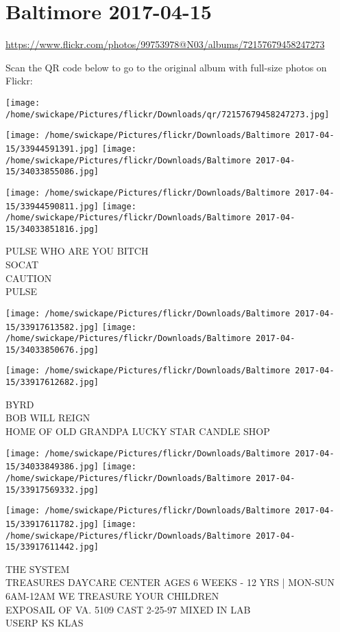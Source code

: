 \documentclass[10pt,letterpaper]{article}
\begin{document}
\section*{Baltimore 2017-04-15}

\url{https://www.flickr.com/photos/99753978@N03/albums/72157679458247273}

Scan the QR code below to go to the original album with full-size photos on Flickr:

\texttt{[image: /home/swickape/Pictures/flickr/Downloads/qr/72157679458247273.jpg]}
\pagebreak

\texttt{[image: /home/swickape/Pictures/flickr/Downloads/Baltimore 2017-04-15/33944591391.jpg]}
\texttt{[image: /home/swickape/Pictures/flickr/Downloads/Baltimore 2017-04-15/34033855086.jpg]}

\texttt{[image: /home/swickape/Pictures/flickr/Downloads/Baltimore 2017-04-15/33944590811.jpg]}
\texttt{[image: /home/swickape/Pictures/flickr/Downloads/Baltimore 2017-04-15/34033851816.jpg]}

PULSE WHO ARE YOU BITCH\\
SOCAT\\
CAUTION\\
PULSE
\pagebreak

\texttt{[image: /home/swickape/Pictures/flickr/Downloads/Baltimore 2017-04-15/33917613582.jpg]}
\texttt{[image: /home/swickape/Pictures/flickr/Downloads/Baltimore 2017-04-15/34033850676.jpg]}

\vspace{0.25in}
\texttt{[image: /home/swickape/Pictures/flickr/Downloads/Baltimore 2017-04-15/33917612682.jpg]}

BYRD\\
BOB WILL REIGN\\
HOME OF OLD GRANDPA LUCKY STAR CANDLE SHOP
\pagebreak

\texttt{[image: /home/swickape/Pictures/flickr/Downloads/Baltimore 2017-04-15/34033849386.jpg]}
\texttt{[image: /home/swickape/Pictures/flickr/Downloads/Baltimore 2017-04-15/33917569332.jpg]}

\texttt{[image: /home/swickape/Pictures/flickr/Downloads/Baltimore 2017-04-15/33917611782.jpg]}
\texttt{[image: /home/swickape/Pictures/flickr/Downloads/Baltimore 2017-04-15/33917611442.jpg]}

THE SYSTEM\\
TREASURES DAYCARE CENTER AGES 6 WEEKS {-} 12 YRS | MON{-}SUN 6AM{-}12AM WE TREASURE YOUR CHILDREN\\
EXPOSAIL OF VA. 5109 CAST 2{-}25{-}97 MIXED IN LAB\\
USERP KS KLAS
\pagebreak
\end{document}

